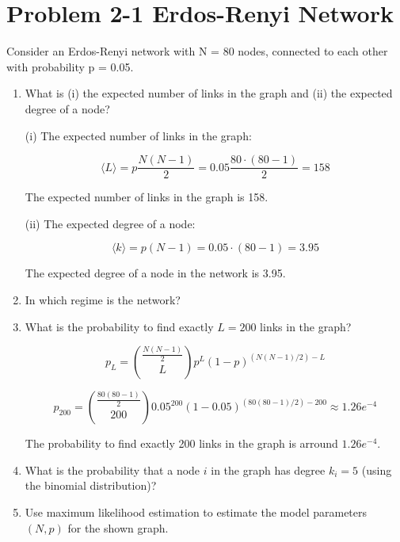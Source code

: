 \section{Problem 2-1 Erdos-Renyi Network}

Consider an Erdos-Renyi network with N = 80 nodes, connected to each other with probability p = 0.05.

\begin{enumerate}
	\item What is (i) the expected number of links in the graph and (ii) the expected degree of a node?
	
	(i) The expected number of links in the graph:
	
	\begin{equation}
	\langle L \rangle = p \frac{N(N-1)}{2} = 0.05 \frac{80 \cdot (80 - 1)}{2} = 158
	\end{equation}
	
	The expected number of links in the graph is 158.
	
	(ii) The expected degree of a node:
	
	\begin{equation}
	\langle k \rangle = p(N-1) = 0.05 \cdot (80 -1) = 3.95
	\end{equation}
	
	The expected degree of a node in the network is 3.95.
	
	\item In which regime is the network?
	
	\item What is the probability to find exactly $L = 200$ links in the graph?
	
	\begin{equation}
	p_L = {{\frac{N(N-1)}{2}} \choose {L}} p^L (1-p)^{(N(N-1)/2)-L}
	\end{equation}
	
	\begin{equation}
	p_{200} = {{\frac{80(80-1)}{2}} \choose {200}} 0.05^{200} (1-0.05)^{(80(80-1)/2)-200} \approx 1.26e^{-4}
	\end{equation}
	
	The probability to find exactly 200 links in the graph is arround $1.26e^{-4}$.
	
	\item What is the probability that a node $i$ in the graph has degree $k_i = 5$ (using the binomial distribution)?
	
	\item Use maximum likelihood estimation to estimate the model parameters $(N, p)$ for the shown graph.
	
	
	
	
\end{enumerate}